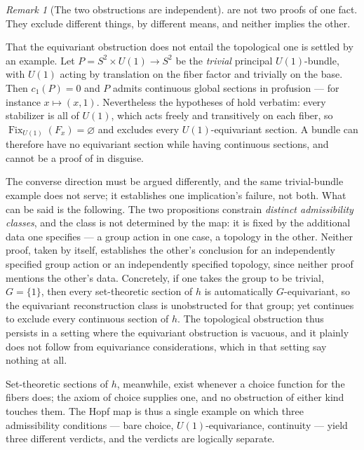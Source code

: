 \documentclass[11pt,reqno]{amsart}
\theoremstyle{plain}
\theoremstyle{definition}
\theoremstyle{remark}
\newtheorem{remark}[theorem]{Remark}
\DeclareMathOperator{\Fix}{Fix}
\begin{document}
\begin{remark}[The two obstructions are independent]
\label{rem:hopfindep}
 are not two proofs of one fact. They exclude different things, by different means, and neither implies the other.

That the equivariant obstruction does not entail the topological one is settled by an example. Let $P=S^{2}\times U(1)\to S^{2}$ be the \emph{trivial} principal $U(1)$-bundle, with $U(1)$ acting by translation on the fiber factor and trivially on the base. Then $c_{1}(P)=0$ and $P$ admits continuous global sections in profusion --- for instance $x\mapsto(x,1)$. Nevertheless the hypotheses of  hold verbatim: every stabilizer is all of $U(1)$, which acts freely and transitively on each fiber, so $\Fix_{U(1)}(F_{x})=\varnothing$ and  excludes every $U(1)$-equivariant section. A bundle can therefore have no equivariant section while having continuous sections, and  cannot be a proof of  in disguise.

The converse direction must be argued differently, and the same trivial-bundle example does not serve; it establishes one implication's failure, not both. What can be said is the following. The two propositions constrain \emph{distinct admissibility classes}, and the class is not determined by the map: it is fixed by the additional data one specifies --- a group action in one case, a topology in the other. Neither proof, taken by itself, establishes the other's conclusion for an independently specified group action or an independently specified topology, since neither proof mentions the other's data. Concretely, if one takes the group to be trivial, $G=\{1\}$, then every set-theoretic section of $h$ is automatically $G$-equivariant, so the equivariant reconstruction class is unobstructed for that group; yet  continues to exclude every continuous section of $h$. The topological obstruction thus persists in a setting where the equivariant obstruction is vacuous, and it plainly does not follow from equivariance considerations, which in that setting say nothing at all.

Set-theoretic sections of $h$, meanwhile, exist whenever a choice function for the fibers does; the axiom of choice supplies one, and no obstruction of either kind touches them. The Hopf map is thus a single example on which three admissibility conditions --- bare choice, $U(1)$-equivariance, continuity --- yield three different verdicts, and the verdicts are logically separate.
\end{remark}
\end{document}
